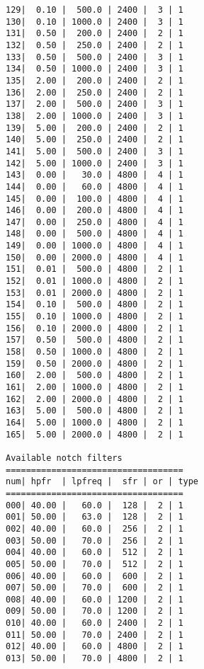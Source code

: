 \documentclass[letterpaper, oneside, 12pt]{article}
\begin{document}
\begin{verbatim}
129|  0.10 |  500.0 | 2400 |  3 | 1
130|  0.10 | 1000.0 | 2400 |  3 | 1
131|  0.50 |  200.0 | 2400 |  2 | 1
132|  0.50 |  250.0 | 2400 |  2 | 1
133|  0.50 |  500.0 | 2400 |  3 | 1
134|  0.50 | 1000.0 | 2400 |  3 | 1
135|  2.00 |  200.0 | 2400 |  2 | 1
136|  2.00 |  250.0 | 2400 |  2 | 1
137|  2.00 |  500.0 | 2400 |  3 | 1
138|  2.00 | 1000.0 | 2400 |  3 | 1
139|  5.00 |  200.0 | 2400 |  2 | 1
140|  5.00 |  250.0 | 2400 |  2 | 1
141|  5.00 |  500.0 | 2400 |  3 | 1
142|  5.00 | 1000.0 | 2400 |  3 | 1
143|  0.00 |   30.0 | 4800 |  4 | 1
144|  0.00 |   60.0 | 4800 |  4 | 1
145|  0.00 |  100.0 | 4800 |  4 | 1
146|  0.00 |  200.0 | 4800 |  4 | 1
147|  0.00 |  250.0 | 4800 |  4 | 1
148|  0.00 |  500.0 | 4800 |  4 | 1
149|  0.00 | 1000.0 | 4800 |  4 | 1
150|  0.00 | 2000.0 | 4800 |  4 | 1
151|  0.01 |  500.0 | 4800 |  2 | 1
152|  0.01 | 1000.0 | 4800 |  2 | 1
153|  0.01 | 2000.0 | 4800 |  2 | 1
154|  0.10 |  500.0 | 4800 |  2 | 1
155|  0.10 | 1000.0 | 4800 |  2 | 1
156|  0.10 | 2000.0 | 4800 |  2 | 1
157|  0.50 |  500.0 | 4800 |  2 | 1
158|  0.50 | 1000.0 | 4800 |  2 | 1
159|  0.50 | 2000.0 | 4800 |  2 | 1
160|  2.00 |  500.0 | 4800 |  2 | 1
161|  2.00 | 1000.0 | 4800 |  2 | 1
162|  2.00 | 2000.0 | 4800 |  2 | 1
163|  5.00 |  500.0 | 4800 |  2 | 1
164|  5.00 | 1000.0 | 4800 |  2 | 1
165|  5.00 | 2000.0 | 4800 |  2 | 1

Available notch filters
===================================
num| hpfr  | lpfreq |  sfr | or | type
===================================
000| 40.00 |   60.0 |  128 |  2 | 1
001| 50.00 |   63.0 |  128 |  2 | 1
002| 40.00 |   60.0 |  256 |  2 | 1
003| 50.00 |   70.0 |  256 |  2 | 1
004| 40.00 |   60.0 |  512 |  2 | 1
005| 50.00 |   70.0 |  512 |  2 | 1
006| 40.00 |   60.0 |  600 |  2 | 1
007| 50.00 |   70.0 |  600 |  2 | 1
008| 40.00 |   60.0 | 1200 |  2 | 1
009| 50.00 |   70.0 | 1200 |  2 | 1
010| 40.00 |   60.0 | 2400 |  2 | 1
011| 50.00 |   70.0 | 2400 |  2 | 1
012| 40.00 |   60.0 | 4800 |  2 | 1
013| 50.00 |   70.0 | 4800 |  2 | 1
\end{verbatim}
\end{document}
